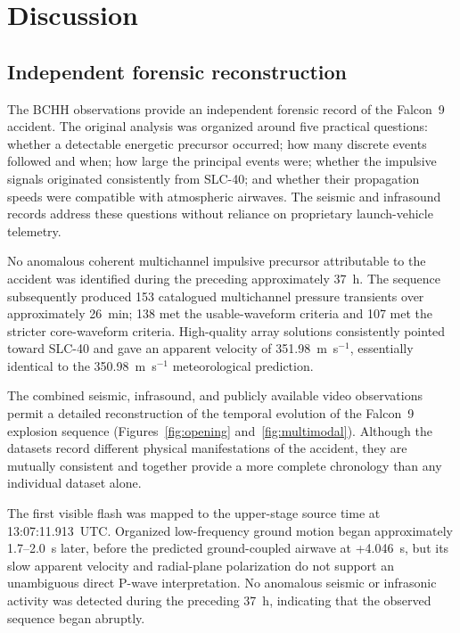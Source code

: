 \documentclass[]{seismica}
\begin{document}
\section{Discussion}
\label{sec:discussion}

\subsection{Independent forensic reconstruction}
\label{sec:discussion_reconstruction}

The BCHH observations provide an independent forensic record of the Falcon~9
accident. The original analysis was organized around five practical questions:
whether a detectable energetic precursor occurred; how many discrete events
followed and when; how large the principal events were; whether the impulsive
signals originated consistently from SLC-40; and whether their propagation
speeds were compatible with atmospheric airwaves. The seismic and infrasound
records address these questions without reliance on proprietary launch-vehicle
telemetry.

No anomalous coherent multichannel impulsive precursor attributable to the
accident was identified during the preceding approximately 37~h. The sequence
subsequently produced 153 catalogued multichannel pressure transients over
approximately 26~min; 138 met the usable-waveform criteria and 107 met the
stricter core-waveform criteria. High-quality array solutions consistently
pointed toward SLC-40 and gave an apparent velocity of 351.98~m~s$^{-1}$,
essentially identical to the 350.98~m~s$^{-1}$ meteorological prediction.

The combined seismic, infrasound, and publicly available video observations
permit a detailed reconstruction of the temporal evolution of the Falcon~9
explosion sequence (Figures~\ref{fig:opening} and~\ref{fig:multimodal}). Although the datasets record
different physical manifestations of the accident, they are mutually
consistent and together provide a more complete chronology than any individual
dataset alone.

The first visible flash was mapped to the upper-stage source time at
13:07:11.913~UTC. Organized low-frequency ground motion began approximately
1.7--2.0~s later, before the predicted ground-coupled airwave at +4.046~s, but
its slow apparent velocity and radial-plane polarization do not support an
unambiguous direct P-wave interpretation. No anomalous seismic or infrasonic
activity was detected during the preceding 37~h, indicating that the observed
sequence began abruptly.
\end{document}
